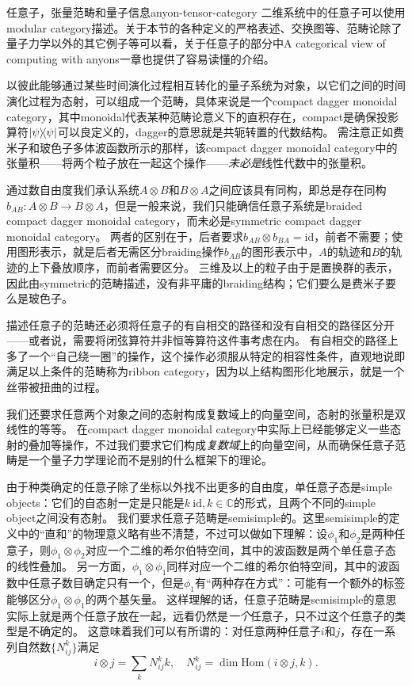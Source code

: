 \begin{back}{任意子，张量范畴和量子信息}{anyon-tensor-category}
    二维系统中的任意子可以使用modular category描述。关于本节的各种定义的严格表述、交换图等、范畴论除了量子力学以外的其它例子等可以看\cite{beer2018categories}，关于任意子的部分\cite{new_structures}中A categorical view of computing with anyons一章也提供了容易读懂的介绍。
    
    以彼此能够通过某些时间演化过程相互转化的量子系统为对象，以它们之间的时间演化过程为态射，可以组成一个范畴，具体来说是一个compact dagger monoidal category，其中monoidal代表某种范畴论意义下的直积存在，compact是确保投影算符$\dyad{\psi}$可以良定义的，dagger的意思就是共轭转置的代数结构。
    需注意正如费米子和玻色子多体波函数所示的那样，该compact dagger monoidal category中的张量积——将两个粒子放在一起这个操作——\emph{未必是}线性代数中的张量积。

    通过数自由度我们承认系统$A \otimes B$和$B \otimes A$之间应该具有同构，即总是存在同构$b_{AB} :A \otimes B \to B \otimes A$，但是一般来说，我们只能确信任意子系统是braided compact dagger monoidal category，而未必是symmetric compact dagger monoidal category。
    两者的区别在于，后者要求$b_{AB} \otimes b_{BA} = \mathrm{id}$，前者不需要；使用图形表示，就是后者无需区分braiding操作$b_{AB}$的图形表示中，$A$的轨迹和$B$的轨迹的上下叠放顺序，而前者需要区分。
    三维及以上的粒子由于是置换群的表示，因此由symmetric的范畴描述，没有非平庸的braiding结构；它们要么是费米子要么是玻色子。

    描述任意子的范畴还必须将任意子的有自相交的路径和没有自相交的路径区分开——或者说，需要将闭弦算符并非恒等算符这件事考虑在内。
    有自相交的路径上多了一个“自己绕一圈”的操作，这个操作必须服从特定的相容性条件，直观地说即 %
    满足以上条件的范畴称为ribbon category，因为以上结构图形化地展示，就是一个丝带被扭曲的过程。

    我们还要求任意两个对象之间的态射构成复数域上的向量空间，态射的张量积是双线性的等等。
    在compact dagger monoidal category中实际上已经能够定义一些态射的叠加等操作，不过我们要求它们构成\emph{复数域}上的向量空间，从而确保任意子范畴是一个量子力学理论而不是别的什么框架下的理论。

    由于种类确定的任意子除了坐标以外找不出更多的自由度，单任意子态是simple objects：它们的自态射一定是只能是$k \  \mathrm{id}, k \in \mathbb{C}$的形式，且两个不同的simple object之间没有态射。
    我们要求任意子范畴是semisimple的。这里semisimple的定义中的“直和”的物理意义略有些不清楚，不过可以做如下理解：设$\phi_1$和$\phi_2$是两种任意子，则$\phi_1 \otimes \phi_2$对应一个二维的希尔伯特空间，其中的波函数是两个单任意子态的线性叠加。
    另一方面，$\phi_1 \otimes \phi_1$同样对应一个二维的希尔伯特空间，其中的波函数中任意子数目确定只有一个，但是$\phi_1$有“两种存在方式”：可能有一个额外的标签能够区分$\phi_1 \otimes \phi_1$的两个基矢量。
    这样理解的话，任意子范畴是semisimple的意思实际上就是两个任意子放在一起，远看仍然是\emph{一个}任意子，只不过这个任意子的类型是不确定的。
    这意味着我们可以有所谓的：对任意两种任意子$i$和$j$，存在一系列自然数$\{N_{ij}^k\}$满足
    \begin{equation}
        i \otimes j = \sum_k N_{ij}^k k, \quad N_{ij}^k = \dim \mathrm{Hom}(i \otimes j, k).
    \end{equation}


\end{back}
